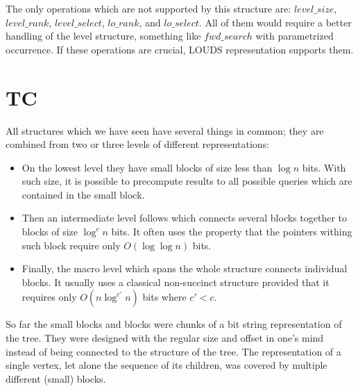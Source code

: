 \begin{algorithmic}
	\State {}
\EndFunction
\end{algorithmic}

\begin{algorithmic}
	\State {}
\EndFunction
\end{algorithmic}

\begin{algorithmic}
	\State {}
\EndFunction
\end{algorithmic}

\bigskip

The only operations which are not supported by this structure are: $level\_size$, $level\_rank$, $level\_select$, $lo\_rank$, and $lo\_select$.
All of them would require a better handling of the level structure, something like $fwd\_search$ with parametrized occurrence.
If these operations are crucial, LOUDS representation supports them.

\section{TC}

All structures which we have seen have several things in common; they are combined from two or three levels of different representations:
\begin{itemize}
	\item On the lowest level they have small blocks of size less than $\log n$ bits.
	With such size, it is possible to precompute results to all possible queries which are contained in the small block.
	\item Then an intermediate level follows which connects several blocks together to blocks of size $\log^c n$ bits.
	It often uses the property that the pointers withing such block require only $O(\log \log n)$ bits.
	\item Finally, the macro level which spans the whole structure connects individual blocks.
	It usually uses a classical non-succinct structure provided that it requires only $O(n \log^{c'} n)$ bits where $c' < c$.
\end{itemize}

So far the small blocks and blocks were chunks of a bit string representation of the tree.
They were designed with the regular size and offset in one's mind instead of being connected to the structure of the tree.
The representation of a single vertex, let alone the sequence of its children, was covered by multiple different (small) blocks.

